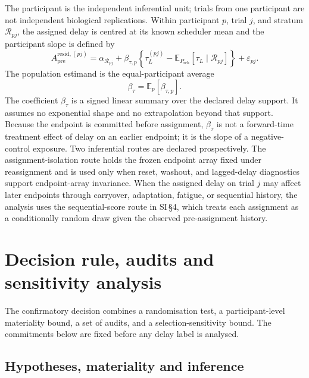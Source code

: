 \documentclass[11pt,a4paper]{article}
\theoremstyle{definition}
\newcommand{\Apre}{A_{\mathrm{pre}}}
\newcommand{\tauL}{\tau_L}
\begin{document}
The participant is the independent inferential unit; trials from one participant
are not independent biological replications. Within participant \(p\), trial
\(j\), and stratum \(\mathcal{R}_{pj}\), the assigned delay is centred at its
known scheduler mean and the participant slope is defined by
\begin{equation}
\label{eq:participant-slope}
\Apre^{\mathrm{resid},(pj)}
=\alpha_{\mathcal{R}_{pj}}
+\beta_{\tau,p}\!\left\{\tauL^{(pj)}
-\mathbb{E}_{P_{\mathrm{sch}}}\!\left[\tauL\mid\mathcal{R}_{pj}\right]\right\}
+\varepsilon_{pj}.
\end{equation}
The population estimand is the equal-participant average
\begin{equation}
\label{eq:population-slope}
\beta_\tau=\mathbb{E}_p\!\left[\beta_{\tau,p}\right].
\end{equation}
The coefficient \(\beta_\tau\) is a signed linear summary over the declared delay
support. It assumes no exponential shape and no extrapolation beyond that support.
Because the endpoint is committed before assignment, \(\beta_\tau\) is not a
forward-time treatment effect of delay on an earlier endpoint; it is the slope of
a negative-control exposure.
Two inferential routes are declared prospectively. The assignment-isolation route
holds the frozen endpoint array fixed under reassignment and is used only when
reset, washout, and lagged-delay diagnostics support endpoint-array invariance.
When the assigned delay on trial \(j\) may affect later endpoints through
carryover, adaptation, fatigue, or sequential history, the analysis uses the
sequential-score route in SI\,\S4, which treats each assignment as a
conditionally random draw given the observed pre-assignment history.
\section{Decision rule, audits and sensitivity analysis}
\label{sec:decision-audits-sensitivity}

The confirmatory decision combines a randomisation test, a participant-level
materiality bound, a set of audits, and a selection-sensitivity bound. The
commitments below are fixed before any delay label is analysed.

\subsection{Hypotheses, materiality and inference}
\label{sec:inference}
\end{document}

